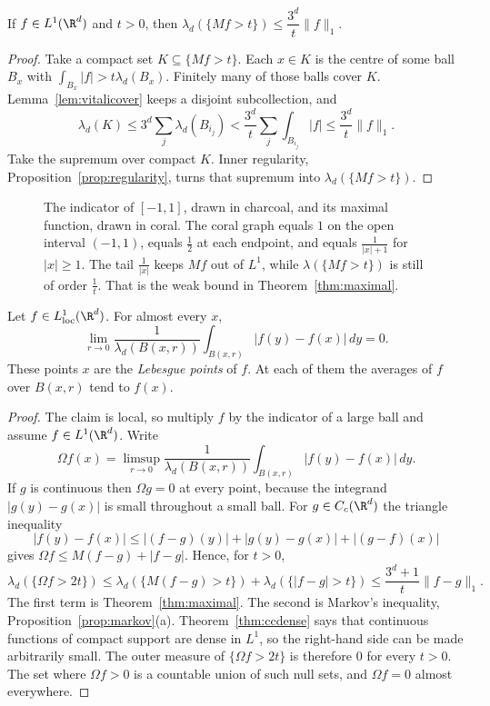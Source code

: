 \begin{theorem}\label{thm:maximal}
If $f\in L^1(\R^d)$ and $t>0$, then $\lambda_d(\{Mf>t\})\le\dfrac{3^d}t\|f\|_1$.
\end{theorem}
\begin{proof}
Take a compact set $K\subseteq\{Mf>t\}$. Each $x\in K$ is the centre of some ball $B_x$ with $\int_{B_x}|f|>t\lambda_d(B_x)$. Finitely many of those balls cover $K$. Lemma~\ref{lem:vitalicover} keeps a disjoint subcollection, and
\[
\lambda_d(K)\le3^d\sum_j\lambda_d(B_{i_j})<\frac{3^d}t\sum_j\int_{B_{i_j}}|f|\le\frac{3^d}t\|f\|_1.
\]
Take the supremum over compact $K$. Inner regularity, Proposition~\ref{prop:regularity}, turns that supremum into $\lambda_d(\{Mf>t\})$.
\end{proof}

\begin{figure}[ht]
\centering
{}
\caption{The indicator of $[-1,1]$, drawn in charcoal, and its maximal function, drawn in coral. The coral graph equals $1$ on the open interval $(-1,1)$, equals $\frac12$ at each endpoint, and equals $\frac1{|x|+1}$ for $|x|\ge1$. The tail $\frac1{|x|}$ keeps $Mf$ out of $L^1$, while $\lambda(\{Mf>t\})$ is still of order $\frac1t$. That is the weak bound in Theorem~\ref{thm:maximal}.}
\label{fig:maximal}
\end{figure}

\begin{theorem}\label{thm:lebdiff}
Let $f\in L^1_{\mathrm{loc}}(\R^d)$. For almost every $x$,
\[\lim_{r\to0}\frac1{\lambda_d(B(x,r))}\int_{B(x,r)}|f(y)-f(x)|\,dy=0.\]
These points $x$ are the \emph{Lebesgue points} of $f$. At each of them the averages of $f$ over $B(x,r)$ tend to $f(x)$.
\end{theorem}
\begin{proof}
The claim is local, so multiply $f$ by the indicator of a large ball and assume $f\in L^1(\R^d)$. Write
\[
\Omega f(x)=\limsup_{r\to0}\frac1{\lambda_d(B(x,r))}\int_{B(x,r)}|f(y)-f(x)|\,dy.
\]
If $g$ is continuous then $\Omega g=0$ at every point, because the integrand $|g(y)-g(x)|$ is small throughout a small ball. For $g\in C_c(\R^d)$ the triangle inequality
\[
|f(y)-f(x)|\le|(f-g)(y)|+|g(y)-g(x)|+|(g-f)(x)|
\]
gives $\Omega f\le M(f-g)+|f-g|$. Hence, for $t>0$,
\[
\lambda_d(\{\Omega f>2t\})\le\lambda_d(\{M(f-g)>t\})+\lambda_d(\{|f-g|>t\})\le\frac{3^d+1}t\|f-g\|_1.
\]
The first term is Theorem~\ref{thm:maximal}. The second is Markov's inequality, Proposition~\ref{prop:markov}(a). Theorem~\ref{thm:ccdense} says that continuous functions of compact support are dense in $L^1$, so the right-hand side can be made arbitrarily small. The outer measure of $\{\Omega f>2t\}$ is therefore $0$ for every $t>0$. The set where $\Omega f>0$ is a countable union of such null sets, and $\Omega f=0$ almost everywhere.
\end{proof}

